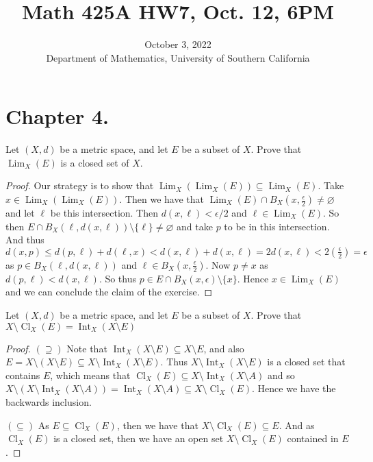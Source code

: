 \documentclass[10pt,reqno]{amsart}
\title{Math 425A HW7, Oct. 12, 6PM}
\date{October 3, 2022 \\ {Department of Mathematics, University of Southern California}}
\theoremstyle{definition}
\DeclareMathOperator{\Lim}{Lim}
\DeclareMathOperator{\Int}{Int}
\DeclareMathOperator{\Cl}{Cl}
\begin{document}
\maketitle
\setcounter{tocdepth}{4}
\setcounter{secnumdepth}{4}

\section{Chapter 4.}

\begin{tcolorbox}[colback=black!5!white,colframe=black!75!black,title= Chapter 4 $\S 1.2$: Exercise 1.8.] Let $(X,d)$ be a metric space, and let $E$ be a subset of $X$. Prove that $\Lim_X(E)$ is a closed set of $X$.
\tcblower 
\begin{proof} Our strategy is to show that $\Lim_X(\Lim_X(E)) \subseteq \Lim_X(E)$. Take $x \in \Lim_X(\Lim_X(E))$. Then we have that $\Lim_X(E) \cap B_X(x, \frac{\epsilon}{2}) \neq \varnothing$ and let $\ell$ be this intersection. Then $d(x, \ell) < \epsilon/2$ and $\ell \in \Lim_X(E)$. So then $E \cap B_X(\ell, d(x, \ell)) \setminus \{ \ell \} \neq \varnothing$ and take $p$ to be in this intersection. And thus $d(x,p) \leq d(p,\ell  ) + d(\ell, x)<d(x,\ell ) + d(x,\ell ) = 2d(x, \ell ) < 2(\frac{\epsilon}{2}) = \epsilon$ as $p \in B_X(\ell, d(x,\ell))$ and $\ell \in B_X(x,\frac{\epsilon}{2})$. Now $p \neq x$ as $d(p, \ell) < d(x, \ell)$. So thus $p \in E \cap B_X(x,\epsilon) \setminus \{ x \} $. Hence $x \in \Lim_X(E)$ and we can conclude the claim of the exercise. 
\end{proof}

\end{tcolorbox}

\begin{tcolorbox}[colback=black!5!white,colframe=black!75!black,title= Chapter 4 $\S 1.2$: Exercise 1.9.] Let $(X, d)$ be a metric space, and let $E$ be a subset of $X$. Prove that $X\setminus \Cl_X (E) = \Int_X (X\setminus E)$ 
\tcblower 
\begin{proof} $(\supseteq)$ Note that $\Int_X(X \setminus E) \subseteq X \setminus E$, and also $E = X \setminus (X \setminus E) \subseteq X \setminus  \Int_X(X\setminus E)$. Thus $X \setminus \Int_X( X\setminus E)$ is a closed set that contains $E$, which means that $\Cl_X(E) \subseteq X \setminus \Int_X ( X\setminus A)$ and so $X \setminus ( X \setminus \Int_X( X \setminus A)) = \Int_X(X \setminus A) \subseteq X \setminus \Cl_X(E)$. Hence we have the backwards inclusion.

$(\subseteq)$ As $E \subseteq \Cl_X(E)$, then we have that $X \setminus \Cl_X(E) \subseteq E$. And as $\Cl_X (E)$ is a closed set, then we have an open set $X \setminus \Cl_X(E)$ contained in $E$. 
\end{proof}
\end{tcolorbox}
\end{document}

